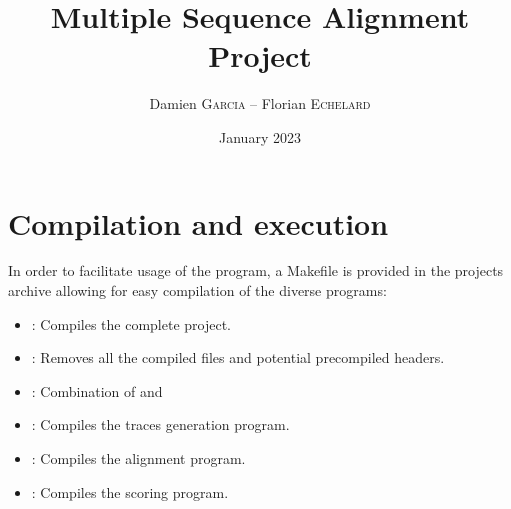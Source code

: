 \documentclass[12pt,a4paper]{article}
\begin{document}
	
\title{Multiple Sequence Alignment Project}
\author{Damien \textsc{Garcia} -- Florian \textsc{Echelard}}
\date{January 2023}

\begin{tcolorbox}
	\maketitle
\end{tcolorbox}

\tableofcontents
\listoffigures
\listoftables
	
\thispagestyle{empty}
\pagebreak


\section{Compilation and execution}

In order to facilitate usage of the program, a Makefile is provided in the projects archive allowing for easy compilation of the diverse programs:
\begin{itemize}
	\item {} : Compiles the complete project.
	\item {} : Removes all the compiled files and potential precompiled headers.
	\item {} : Combination of {} and {}
	\item {} : Compiles the traces generation program.
	\item {} : Compiles the alignment program.
	\item {} : Compiles the scoring program.
\end{itemize}
\end{document}
